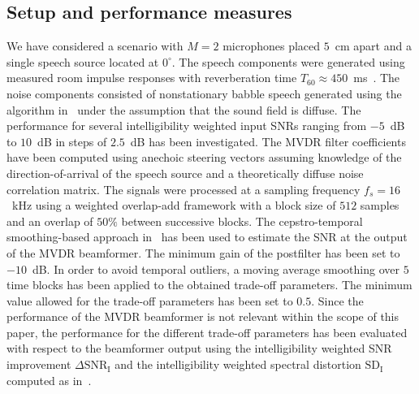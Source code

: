 \documentclass{article}
\begin{document}
\subsection{Setup and performance measures}
We have considered a scenario with $M=2$ microphones placed $5$~cm apart and a single speech source located at $0^\circ$. 
The speech components were generated using measured room impulse responses with reverberation time $T_{60} \approx 450$~ms~\cite{Wen_IWAENC_2006}. 
The noise components consisted of nonstationary babble speech generated using the algorithm in~\cite{Habets2008} under the assumption that the sound field is diffuse.
The performance for several intelligibility weighted input SNRs ranging from $-5$~dB to $10$~dB in steps of $2.5$~dB has been investigated.
The MVDR filter coefficients have been computed using anechoic steering vectors assuming knowledge of the direction-of-arrival of the speech source and a theoretically diffuse noise correlation matrix.
The signals were processed at a sampling frequency $f_s = 16$~kHz using a weighted overlap-add framework with a block size of $512$ samples and an overlap of $50 \%$ between successive blocks. 
The cepstro-temporal smoothing-based approach in~\cite{Breihaupt_ICASSP_2008} has been used to estimate the SNR at the output of the MVDR beamformer. 
The minimum gain of the postfilter has been set to $-10$~dB.
In order to avoid temporal outliers, a moving average smoothing over $5$ time blocks has been applied to the obtained trade-off parameters. 
The minimum value allowed for the trade-off parameters has been set to $0.5$.
Since the performance of the MVDR beamformer is not relevant within the scope of this paper, the performance for the different trade-off parameters has been evaluated with respect to the beamformer output using the intelligibility weighted SNR improvement $\Delta \text{SNR}_{\text{I}}$ and the intelligibility weighted spectral distortion $\text{SD}_{\text{I}}$ computed as in~\cite{Doclo_SC_2007}.
\end{document}
